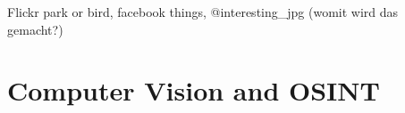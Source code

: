 \documentclass[twoside,a4paper]{article}
\begin{document}
Flickr park or bird, facebook things, @interesting\_jpg (womit wird das gemacht?)

\section{Computer Vision and OSINT}
\label{sec:zusammenhang}


\newpage
\printglossary

\nocite{*}

\end{document}
